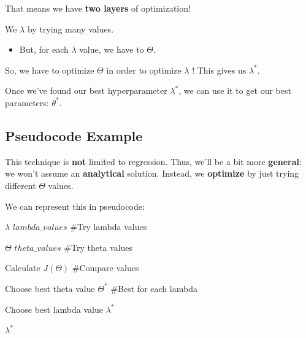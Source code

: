         That means we have \textbf{two layers} of optimization!\\
        
        \begin{clarification}
            We  $\lambda$ by trying many values.

            \begin{itemize}
                \item But, for each $\lambda$ value, we have to  $\Theta$.
            \end{itemize}
            
            So, we have to optimize $\Theta$  in order to optimize $\lambda$ ! This gives us $\lambda^*.$
        \end{clarification}
        
        Once we've found our best hyperparameter $\lambda^*$, we can use it to get our best parameters: $\theta^*$.
        
    \subsection{Pseudocode Example}
        
        This technique is \textbf{not} limited to regression. Thus, we'll be a bit more \textbf{general}: we won't assume an \textbf{analytical} solution. Instead, we \textbf{optimize} by just trying different $\Theta$ values.
        
        We can represent this in pseudocode:
        
        \begin{codebox}
                       
                \li \For $\lambda$ \In $lambda\_values$        
                \qquad\quad\#Try lambda values
                
                \li     \Do \For $\Theta$ \In $theta\_values$  
                \qquad\quad\#Try theta values    
                            \Do

                                \li Calculate $J(\Theta)$    
                                \qquad\qquad\qquad\#Compare values
                            \End
                        
                        \li Choose best theta value $\Theta^*$ 
                        \quad\#Best for each lambda

                        \End
                \li Choose best lambda value $\lambda^*$
                \li
                    
                \li \Return $\lambda^*$
        \end{codebox}
        
